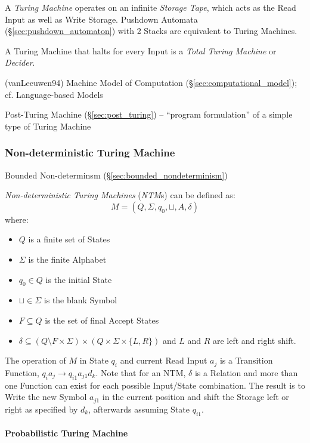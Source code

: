 A \emph{Turing Machine} operates on an infinite \emph{Storage Tape},
which acts as the Read Input as well as Write Storage. Pushdown
Automata (\S\ref{sec:pushdown_automaton}) with 2 Stacks are equivalent
to Turing Machines.

A Turing Machine that halts for every Input is a \emph{Total Turing
  Machine} or \emph{Decider}.

(vanLeeuwen94) Machine Model of Computation (\S\ref{sec:computational_model});
cf. Language-based Models

\fist Post-Turing Machine (\S\ref{sec:post_turing}) -- ``program formulation''
of a simple type of Turing Machine



\subsubsection{Non-deterministic Turing Machine}
\label{sec:nondeterministic_turing_machine}

\fist Bounded Non-determinsm (\S\ref{sec:bounded_nondeterminism})

\emph{Non-deterministic Turing Machines} (\emph{NTM}s) can be defined
as:
\[
  M = (Q, \Sigma, q_0, \sqcup, A, \delta)
\]
where:
\begin{itemize}
  \item $Q$ is a finite set of States
  \item $\Sigma$ is the finite Alphabet
  \item $q_0 \in Q$ is the initial State
  \item $\sqcup \in \Sigma$ is the blank Symbol
  \item $F \subseteq Q$ is the set of final Accept States
  \item $\delta \subseteq (Q \setminus F \times \Sigma) \times (Q
    \times \Sigma \times \{L,R\})$ and $L$ and $R$ are left and right
    shift.
\end{itemize}

The operation of $M$ in State $q_i$ and current Read Input $a_j$ is a
Transition Function, $q_i a_j \rightarrow q_{i1} a_{j1} d_k$. Note
that for an NTM, $\delta$ is a Relation and more than one Function can
exist for each possible Input/State combination. The result is to
Write the new Symbol $a_{j1}$ in the current position and shift the
Storage left or right as specified by $d_k$, afterwards assuming State
$q_{i1}$.



\paragraph{Probabilistic Turing Machine}
\label{sec:probabilistic_turing_machine}\hfill

